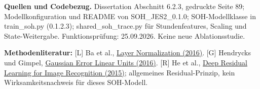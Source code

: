 \textbf{Quellen und Codebezug.} Dissertation Abschnitt 6.2.3, gedruckte Seite 89; Modellkonfiguration und README von SOH\_JES2\_0.1.0; SOH-Modellklasse in train\_soh.py (0.1.2.3); shared\_soh\_trace.py für Stundenfeatures, Scaling und State-Weitergabe. Funktionsprüfung: 25.09.2026. Keine neue Ablationsstudie.

\textbf{Methodenliteratur:} [L] Ba et al., \href{https://arxiv.org/abs/1607.06450}{Layer Normalization (2016)}. [G] Hendrycks und Gimpel, \href{https://arxiv.org/abs/1606.08415}{Gaussian Error Linear Units (2016)}. [R] He et al., \href{https://arxiv.org/abs/1512.03385}{Deep Residual Learning for Image Recognition (2015)}; allgemeines Residual-Prinzip, kein Wirksamkeitsnachweis für dieses SOH-Modell.
